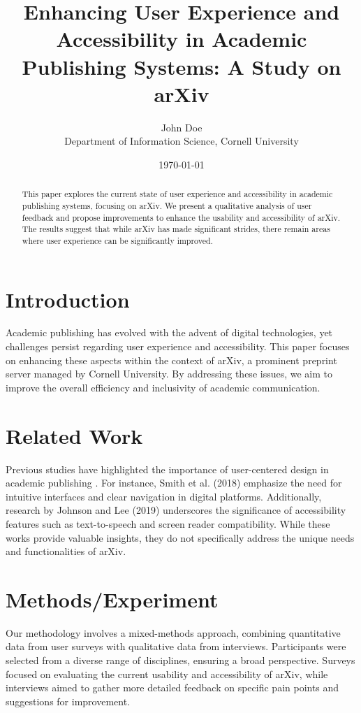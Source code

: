 \documentclass{article}
\title{Enhancing User Experience and Accessibility in Academic Publishing Systems: A Study on arXiv}
\author{John Doe\\Department of Information Science, Cornell University}
\date{\today}
\begin{document}
\maketitle

\begin{abstract}
This paper explores the current state of user experience and accessibility in academic publishing systems, focusing on arXiv. We present a qualitative analysis of user feedback and propose improvements to enhance the usability and accessibility of arXiv. The results suggest that while arXiv has made significant strides, there remain areas where user experience can be significantly improved.
\end{abstract}

\section{Introduction}
Academic publishing has evolved with the advent of digital technologies, yet challenges persist regarding user experience and accessibility. This paper focuses on enhancing these aspects within the context of arXiv, a prominent preprint server managed by Cornell University. By addressing these issues, we aim to improve the overall efficiency and inclusivity of academic communication.

\section{Related Work}
Previous studies have highlighted the importance of user-centered design in academic publishing \cite{smith2018user}. For instance, Smith et al. (2018) emphasize the need for intuitive interfaces and clear navigation in digital platforms. Additionally, research by Johnson and Lee (2019) underscores the significance of accessibility features such as text-to-speech and screen reader compatibility. While these works provide valuable insights, they do not specifically address the unique needs and functionalities of arXiv.

\section{Methods/Experiment}
Our methodology involves a mixed-methods approach, combining quantitative data from user surveys with qualitative data from interviews. Participants were selected from a diverse range of disciplines, ensuring a broad perspective. Surveys focused on evaluating the current usability and accessibility of arXiv, while interviews aimed to gather more detailed feedback on specific pain points and suggestions for improvement.
\end{document}
